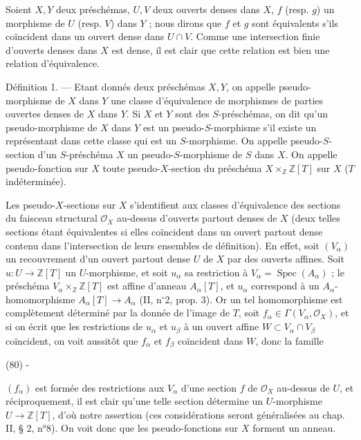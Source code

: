 Soient $X, Y$ deux préschémas, $U, V$ deux ouverts denses dans $X$, $f$ (resp. $g$) un morphisme de $U$ (resp. $V$) dans $Y$ ; nous dirons que $f$ et $g$ sont équivalents s'ils coïncident dans un ouvert dense dans $U \cap V$. Comme une intersection finie d'ouverts denses dans $X$ est dense, il est clair que cette relation est bien une relation d'équivalence.

Définition 1. --- Etant donnés deux préschémas $X, Y$, on appelle pseudo-morphisme de $X$ dans $Y$ une classe d'équivalence de morphismes de parties ouvertes denses de $X$ dans $Y$. Si $X$ et $Y$ sont des $S$-préschémas, on dit qu'un pseudo-morphisme de $X$ dans $Y$ est un pseudo-$S$-morphisme s'il existe un représentant dans cette classe qui est un $S$-morphisme. On appelle pseudo-$S$-section d'un $S$-préschéma $X$ un pseudo-$S$-morphisme de $S$ dans $X$. On appelle pseudo-fonction sur $X$ toute pseudo-$X$-section du préschéma $X \times_{\mathbb{Z}} \mathbb{Z}[T]$ sur $X$ ($T$ indéterminée).

Les pseudo-$X$-sections sur $X$ s'identifient aux classes d'équivalence des sections du faisceau structural $\mathcal{O}_X$ au-dessus d'ouverts partout denses de $X$ (deux telles sections étant équivalentes si elles coïncident dans un ouvert partout dense contenu dans l'intersection de leurs ensembles de définition). En effet, soit $(V_\alpha)$ un recouvrement d'un ouvert partout dense $U$ de $X$ par des ouverts affines. Soit $u : U \to \mathbb{Z}[T]$ un $U$-morphisme, et soit $u_\alpha$ sa restriction à $V_\alpha = \operatorname{Spec}(A_\alpha)$ ; le préschéma $V_\alpha \times_{\mathbb{Z}} \mathbb{Z}[T]$ est affine d'anneau $A_\alpha[T]$, et $u_\alpha$ correspond à un $A_\alpha$-homomorphisme $A_\alpha[T] \to A_\alpha$ (II, n$^\circ$2, prop. 3). Or un tel homomorphisme est complètement déterminé par la donnée de l'image de $T$, soit $f_\alpha \in \Gamma(V_\alpha, \mathcal{O}_X)$, et si on écrit que les restrictions de $u_\alpha$ et $u_\beta$ à un ouvert affine $W \subset V_\alpha \cap V_\beta$ coïncident, on voit aussitôt que $f_\alpha$ et $f_\beta$ coïncident dans $W$, donc la famille

\newpage


(80) -

$(f_\alpha)$ est formée des restrictions aux $V_\alpha$ d'une section $f$ de $\mathcal{O}_X$ au-dessus de $U$, et réciproquement, il est clair qu'une telle section détermine un $U$-morphisme $U \to \mathbb{Z}[T]$, d'où notre assertion (ces considérations seront généralisées au chap. II, § 2, n°8). On voit donc que les pseudo-fonctions sur $X$ forment un anneau.

